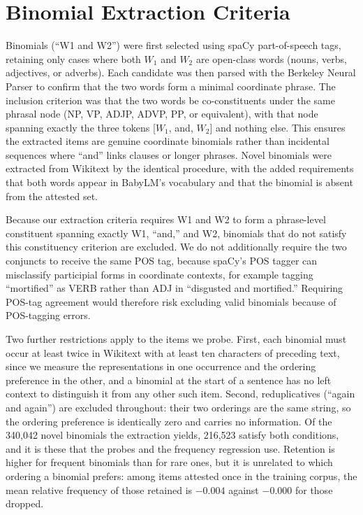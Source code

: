 \documentclass[11pt]{article}
\begin{document}
\endgroup{}

\newpage

\section{Binomial Extraction Criteria}\label{sec-appendix-extraction}

Binomials (``W1 and W2'') were first selected using spaCy \citep{spacy2}
part-of-speech tags, retaining only cases where both \(W_1\) and \(W_2\)
are open-class words (nouns, verbs, adjectives, or adverbs). Each
candidate was then parsed with the Berkeley Neural Parser
\citep{kitaev-klein-2018-constituency, kitaev-etal-2019-multilingual} to
confirm that the two words form a minimal coordinate phrase. The
inclusion criterion was that the two words be co-constituents under the
same phrasal node (NP, VP, ADJP, ADVP, PP, or equivalent), with that
node spanning exactly the three tokens {[}\(W_1\), and, \(W_2\){]} and
nothing else. This ensures the extracted items are genuine coordinate
binomials rather than incidental sequences where ``and'' links clauses
or longer phrases. Novel binomials were extracted from Wikitext by the
identical procedure, with the added requirements that both words appear
in BabyLM's vocabulary and that the binomial is absent from the attested
set.

Because our extraction criteria requires W1 and W2 to form a
phrase-level constituent spanning exactly W1, ``and,'' and W2, binomials
that do not satisfy this constituency criterion are excluded. We do not
additionally require the two conjuncts to receive the same POS tag,
because spaCy's POS tagger can misclassify participial forms in
coordinate contexts, for example tagging ``mortified'' as VERB rather
than ADJ in ``disgusted and mortified.'' Requiring POS-tag agreement
would therefore risk excluding valid binomials because of POS-tagging
errors.

Two further restrictions apply to the items we probe. First, each
binomial must occur at least twice in Wikitext with at least ten
characters of preceding text, since we measure the representations in
one occurrence and the ordering preference in the other, and a binomial
at the start of a sentence has no left context to distinguish it from
any other such item. Second, reduplicatives (``again and again'') are
excluded throughout: their two orderings are the same string, so the
ordering preference is identically zero and carries no information. Of
the 340,042 novel binomials the extraction yields, 216,523 satisfy both
conditions, and it is these that the probes and the frequency regression
use. Retention is higher for frequent binomials than for rare ones, but
it is unrelated to which ordering a binomial prefers: among items
attested once in the training corpus, the mean relative frequency of
those retained is \(-0.004\) against \(-0.000\) for those dropped.
\end{document}
